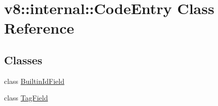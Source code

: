 \hypertarget{classv8_1_1internal_1_1_code_entry}{}\section{v8\+:\+:internal\+:\+:Code\+Entry Class Reference}
\label{classv8_1_1internal_1_1_code_entry}
\subsection*{Classes}
\begin{DoxyCompactItemize}
\item 
class \hyperlink{classv8_1_1internal_1_1_code_entry_1_1_builtin_id_field}{Builtin\+Id\+Field}
\item 
class \hyperlink{classv8_1_1internal_1_1_code_entry_1_1_tag_field}{Tag\+Field}
\end{DoxyCompactItemize}

